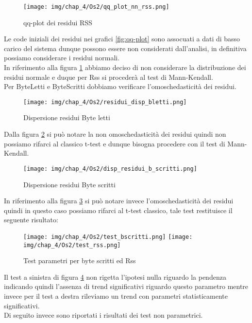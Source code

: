 \begin{figure}[H]
    \centering
    \texttt{[image: img/chap\_4/Os2/qq\_plot\_nn\_rss.png]}
    \caption{qq-plot dei residui RSS}
    \label{fig:residui_non_normali}
\end{figure}    
\noindent
Le code iniziali dei residui nei grafici \ref{fig:qq-plot} sono assocuati a dati di basso carico del sistema dunque possono essere non considerati dall'analisi, in definitiva possiamo considerare i residui normali.\\
In riferimento alla figura \ref{fig:residui_non_normali} abbiamo deciso di non considerare la distribuzione dei residui normale e duque per Rss si procederà al test di Mann-Kendall.\\
Per ByteLetti e ByteScritti dobbiamo verificare l'omoschedasticità dei residui.\\
\begin{figure}[H]
    \centering
    \texttt{[image: img/chap\_4/Os2/residui\_disp\_bletti.png]}
    \caption{Dispersione residui Byte letti }
    \label{fig:residui_non_omoschedastici}
\end{figure}
\noindent
Dalla figura \ref{fig:residui_non_omoschedastici} si può notare la non omoschedasticità dei residui quindi non possiamo rifarci al classico t-test e dunque bisogna procedere con il test di Mann-Kendall.
\begin{figure}[H]
    \centering
    \texttt{[image: img/chap\_4/Os2/disp\_residui\_b\_scritti.png]}
    \caption{Dispersione residui Byte scritti }
    \label{fig:residui_omoschedastici}
\end{figure}
\noindent
In riferimento alla figura \ref{fig:residui_omoschedastici} si può notare invece l'omoschedasticità dei residui quindi in questo caso possiamo rifarci al t-test classico, tale test restituisce il seguente risultato:
\begin{figure}[H]
    \centering
    \texttt{[image: img/chap\_4/Os2/test\_bscritti.png]}
    \texttt{[image: img/chap\_4/Os2/test\_rss.png]}
    \caption{Test parametri per byte scritti ed Rss}
    \label{fig:test_bscritti}
\end{figure}
\noindent
Il test a sinistra di figura \ref{fig:test_bscritti} non rigetta l'ipotesi nulla riguardo la pendenza indicando quindi l'assenza di trend significativi riguardo questo parametro mentre invece per il test a destra rileviamo un trend con parametri statisticamente significativi.\\
Di seguito invece sono riportati i risultati dei test non parametrici.
